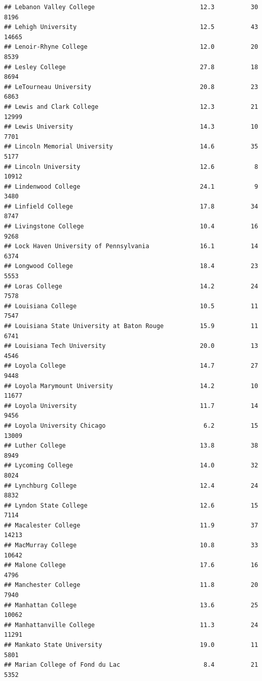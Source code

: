 \documentclass[
]{article}
\begin{document}
\begin{verbatim}
## Lebanon Valley College                             12.3          30   8196
## Lehigh University                                  12.5          43  14665
## Lenoir-Rhyne College                               12.0          20   8539
## Lesley College                                     27.8          18   8694
## LeTourneau University                              20.8          23   6863
## Lewis and Clark College                            12.3          21  12999
## Lewis University                                   14.3          10   7701
## Lincoln Memorial University                        14.6          35   5177
## Lincoln University                                 12.6           8  10912
## Lindenwood College                                 24.1           9   3480
## Linfield College                                   17.8          34   8747
## Livingstone College                                10.4          16   9268
## Lock Haven University of Pennsylvania              16.1          14   6374
## Longwood College                                   18.4          23   5553
## Loras College                                      14.2          24   7578
## Louisiana College                                  10.5          11   7547
## Louisiana State University at Baton Rouge          15.9          11   6741
## Louisiana Tech University                          20.0          13   4546
## Loyola College                                     14.7          27   9448
## Loyola Marymount University                        14.2          10  11677
## Loyola University                                  11.7          14   9456
## Loyola University Chicago                           6.2          15  13009
## Luther College                                     13.8          38   8949
## Lycoming College                                   14.0          32   8024
## Lynchburg College                                  12.4          24   8832
## Lyndon State College                               12.6          15   7114
## Macalester College                                 11.9          37  14213
## MacMurray College                                  10.8          33  10642
## Malone College                                     17.6          16   4796
## Manchester College                                 11.8          20   7940
## Manhattan College                                  13.6          25  10062
## Manhattanville College                             11.3          24  11291
## Mankato State University                           19.0          11   5801
## Marian College of Fond du Lac                       8.4          21   5352

\end{verbatim}
\end{document}
